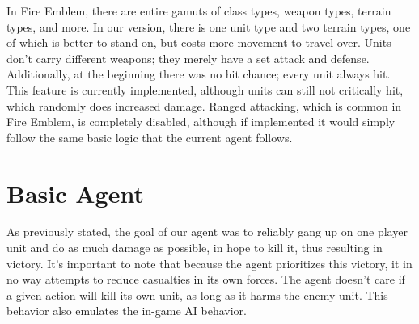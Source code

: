 \documentclass[12pt]{article} %
\begin{document}
In Fire Emblem, there are entire gamuts of class types, weapon types, terrain types, and more. In our version, there is one unit type and two terrain types, one of which is better to stand on, but costs more movement to travel over. Units don’t carry different weapons; they merely have a set attack and defense. Additionally, at the beginning there was no hit chance; every unit always hit. This feature is currently implemented, although units can still not critically hit, which randomly does increased damage. Ranged attacking, which is common in Fire Emblem, is completely disabled, although if implemented it would simply follow the same basic logic that the current agent follows.

\section{Basic Agent}
	As previously stated, the goal of our agent was to reliably gang up on one player unit and do as much damage as possible, in hope to kill it, thus resulting in victory. It’s important to note that because the agent prioritizes this victory, it in no way attempts to reduce casualties in its own forces. The agent doesn’t care if a given action will kill its own unit, as long as it harms the enemy unit. This behavior also emulates the in-game AI behavior.
\end{document}
